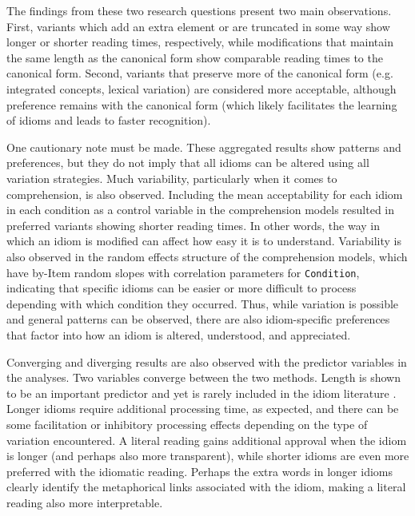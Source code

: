 \documentclass[output=paper,modfonts,nonflat]{langsci/langscibook}
\begin{document}
The findings from these two research questions present two main observations. First, variants which add an extra element or are truncated in some way show longer or shorter reading times, respectively, while modifications that maintain the same length as the canonical form show comparable reading times to the canonical form. Second, variants that preserve more of the canonical form (e.g. integrated concepts, lexical variation) are considered more acceptable, although preference remains with the canonical form (which likely facilitates the learning of idioms and leads to faster recognition).

One cautionary note must be made. These aggregated results show patterns and preferences, but they do not imply that all idioms can be altered using all variation strategies. Much variability, particularly when it comes to comprehension, is also observed. Including the mean acceptability for each idiom in each condition as a control variable in the comprehension models resulted in preferred variants showing shorter reading times. In other words, the way in which an idiom is modified can affect how easy it is to understand. Variability is also observed in the random effects structure of the comprehension models, which have by-Item random slopes with correlation parameters for \texttt{Condition}, indicating that specific idioms can be easier or more difficult to process depending with which condition they occurred. Thus, while variation is possible and general patterns can be observed, there are also idiom-specific preferences that factor into how an idiom is altered, understood, and appreciated. 

   


Converging and diverging results  are also observed with the predictor variables in the analyses. Two variables converge between the two methods. Length is shown to be an important predictor and yet is rarely included in the idiom literature \citep[cf.][]{FanariEtAl2010}. Longer idioms require additional processing time, as expected, and there can be some facilitation or inhibitory processing effects depending on the type of variation encountered. A literal reading gains additional approval when the idiom is longer (and perhaps also more transparent), while shorter idioms are even more preferred with the idiomatic reading. Perhaps the extra words in longer idioms clearly identify the metaphorical links associated with the idiom, making a literal reading also more interpretable.
\end{document}
